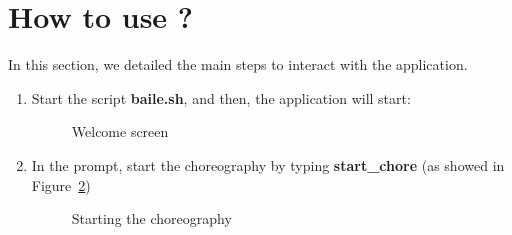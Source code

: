 \documentclass{article}	%
\begin{document}
\newpage 

\section{ How to use ? }
In this section, we detailed the main steps to interact with the application.

\begin{enumerate}
 \item Start the script \textbf{baile.sh}, and then, the application will start:

  \begin{figure}[htbp]
  \centering
  \setlength\fboxrule{1.0pt}
  \caption{Welcome screen}
  \label{welcome-screen}
  \end{figure}

  \item  In the prompt, start the choreography by typing \textbf{start\_chore} (as showed in Figure~\ref{chore})
  
  \begin{figure}[htbp]
  \centering
  \setlength\fboxrule{1.0pt}
  \caption{Starting the choreography}
  \label{chore}
  \end{figure}


\end{enumerate}
\end{document}

